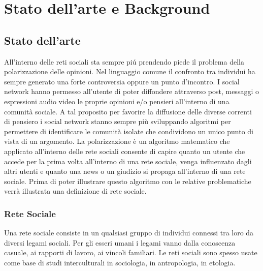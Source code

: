 \chapter{Stato dell'arte e Background}

\label{capitolo2}


\section{Stato dell'arte}
All'interno delle reti sociali sta sempre pi\'u prendendo piede il problema della polarizzazione delle opinioni. Nel linguaggio comune il confronto tra individui ha sempre generato una forte controversia oppure un punto d'incontro. 
I social network hanno permesso all'utente di poter diffondere attraverso post, messaggi o espressioni audio video le proprie opinioni e/o pensieri all'interno di una comunità sociale. A tal proposito per favorire la diffusione delle diverse correnti di pensiero i social network stanno sempre più sviluppando algoritmi per permettere di identificare le comunità isolate che condividono un unico punto di vista di un argomento.
La polarizzazione è un algoritmo matematico che applicato all'interno delle rete sociali consente di capire quanto un utente che accede per la prima volta all'interno di una rete sociale, venga influenzato dagli altri utenti e quanto una news o un giudizio si propaga all'interno di una rete sociale.
Prima di poter illustrare questo algoritmo con le relative problematiche verrà illustrata una definizione di rete sociale.

\subsection{Rete Sociale}
Una rete sociale consiste in un qualsiasi gruppo di individui connessi tra loro da diversi legami sociali. Per gli esseri umani i legami vanno dalla conoscenza casuale, ai rapporti di lavoro, ai vincoli familiari. Le reti sociali sono spesso usate come base di studi interculturali in sociologia, in antropologia, in etologia.

